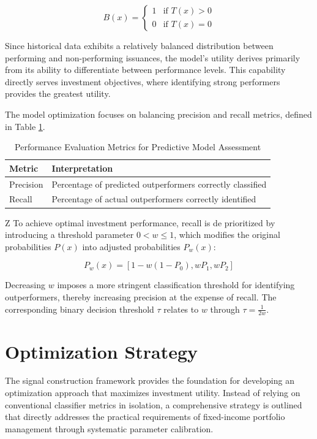 \begin{equation}
B(x) =
\begin{cases}
1 & \text{if } T(x) > 0 \\
0 & \text{if } T(x) = 0
\end{cases}
\end{equation}

Since historical data exhibits a relatively balanced distribution between performing and non-performing issuances, the model's utility derives primarily from its ability to differentiate between performance levels. This capability directly serves investment objectives, where identifying strong performers provides the greatest utility.

The model optimization focuses on balancing precision and recall metrics, defined in Table \ref{tab:precision_recall_definitions}.

\begin{table}[h]
\centering
\small
\begin{tabular}{ll}\toprule
\textbf{Metric} & \textbf{Interpretation} \\\midrule
Precision & Percentage of predicted outperformers correctly classified \\
Recall & Percentage of actual outperformers correctly identified \\\bottomrule
\end{tabular}
\caption{Performance Evaluation Metrics for Predictive Model Assessment}
\label{tab:precision_recall_definitions}
\end{table}
Z
To achieve optimal investment performance, recall is de prioritized by introducing a threshold parameter $0 < w \leq 1$, which modifies the original probabilities $P(x)$ into adjusted probabilities $P_w(x)$:

\begin{equation}
P_w(x) = [1 - w(1 - P_0), wP_1, wP_2]
\end{equation}

Decreasing $w$ imposes a more stringent classification threshold for identifying outperformers, thereby increasing precision at the expense of recall. The corresponding binary decision threshold $\tau$ relates to $w$ through $\tau = \frac{1}{2w}$.

\section{Optimization Strategy}

The signal construction framework provides the foundation for developing an optimization approach that maximizes investment utility. Instead of relying on conventional classifier metrics in isolation, a comprehensive strategy is outlined that directly addresses the practical requirements of fixed-income portfolio management through systematic parameter calibration.

